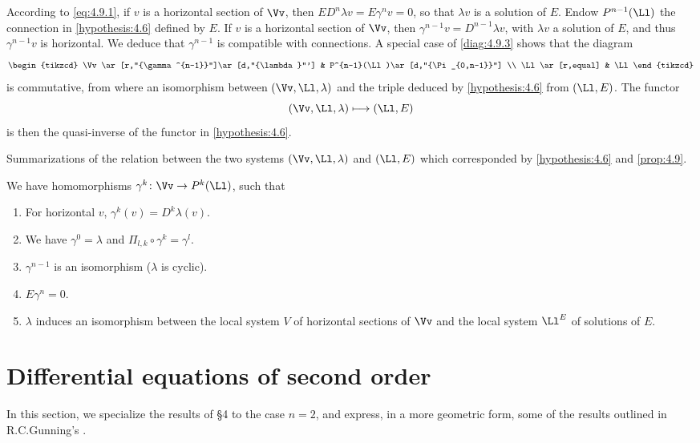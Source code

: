 According to \cref{eq:4.9.1}, if $v$ is a horizontal section of $\Vv$, then
$ED^n\lambda v=E\gamma^n v=0$, so that $\lambda v$ is a solution of $E$.
Endow $P^{n-1}(\Ll)$ the connection in \ref{hypothesis:4.6} defined by $E$.
If $v$ is a horizontal section of $\Vv$, then $\gamma^{n-1}v=D^{n-1}\lambda v$,
with $\lambda v$ a solution of $E$, and thus $\gamma^{n-1}v$ is horizontal.
We deduce that $\gamma^{n-1}$ is compatible with connections.
A special case of \ref{diag:4.9.3} shows that the diagram
\[
\begin{tikzcd}
  \Vv\ar[r,"{\gamma^{n-1}}"]\ar[d,"{\lambda}"'] &
  P^{n-1}(\Ll)\ar[d,"{\Pi_{0,n-1}}"] \\
  \Ll\ar[r,equal] & \Ll
\end{tikzcd}
\]
is commutative, from where an isomorphism between $(\Vv,\Ll,\lambda)$ and the
triple deduced by \ref{hypothesis:4.6} from $(\Ll,E)$.
The functor
\[
(\Vv,\Ll,\lambda)\longmapsto(\Ll,E)
\]
is then the quasi-inverse of the functor in \ref{hypothesis:4.6}.

\begin{para}
  Summarizations of the relation between the two systems
  $(\Vv,\Ll,\lambda)$ and $(\Ll,E)$ which corresponded by \ref{hypothesis:4.6}
  and \ref{prop:4.9}.

  We have homomorphisms $\gamma^k\colon\Vv\to P^k(\Ll)$, such that
  \begin{enumerate}[({4.10.}1)]
    \item For horizontal $v$, $\gamma^k(v)=D^k\lambda(v)$.
    \item We have $\gamma^0=\lambda$ and $\Pi_{l,k}\circ\gamma^k=\gamma^l$.
    \item $\gamma^{n-1}$ is an isomorphism ($\lambda$ is cyclic).
    \item $E\gamma^n = 0$.
    \item $\lambda$ induces an isomorphism between the local system $V$ of
    horizontal sections of $\Vv$ and the local system $\Ll^E$ of solutions of
    $E$.
  \end{enumerate}
\end{para}











\clearpage
\section{Differential equations of second order}
In this section, we specialize the results of \S 4 to the case $n=2$,
and express, in a more geometric form, some of the results outlined in
R.C.Gunning's \cite{Gunning}.


